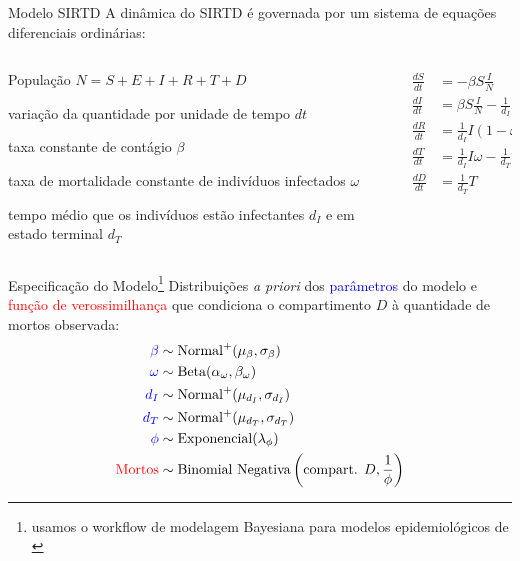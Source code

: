 \documentclass[aspectratio=169]{beamer}                    %
\begin{document}
\begin{frame}{Modelo SIRTD}
    A dinâmica do SIRTD é governada por um sistema de equações diferenciais ordinárias:
    \begin{columns}
        \begin{column}{0.5\textwidth}
            \begin{vfilleditems}
                \item População $N = S +E + I + R + T + D$
                \item variação da quantidade por unidade de tempo $dt$
                \item taxa constante de contágio $\beta$
                \item taxa de mortalidade constante de indivíduos infectados $\omega$
                \item tempo médio que os indivíduos estão infectantes $d_I$ e em estado terminal $d_T$
            \end{vfilleditems}
        \end{column}
        \begin{column}{0.5\textwidth}
            \begin{align*}
                \frac{dS}{dt} &= -\beta  S \frac{I}{N}\\
                \frac{dI}{dt} &= \beta  S  \frac{I}{N} - \frac{1}{d_I}  I \\
                \frac{dR}{dt} &= \frac{1}{d_I} I \left( 1 - \omega \right) \\
                \frac{dT}{dt} &= \frac{1}{d_I} I \omega - \frac{1}{d_T} T \\
                \frac{dD}{dt} &= \frac{1}{d_T} T \\
            \end{align*}
        \end{column}
    \end{columns}
\end{frame}

\begin{frame}{Especificação do Modelo\footnote{usamos o workflow de modelagem Bayesiana para modelos epidemiológicos de \textcite{grinsztajnBayesianWorkflowDisease2021}}}
    Distribuições \textit{a priori} dos \textcolor{blue}{parâmetros} do modelo e \textcolor{red}{função de verossimilhança} que condiciona o compartimento $D$ à quantidade de mortos observada:
    \begin{align*}
        \textcolor{blue}{\beta} &\sim \text{Normal}^+(\mu_\beta, \sigma_\beta) \\
        \textcolor{blue}{\omega} &\sim \text{Beta}(\alpha_\omega, \beta_\omega) \\
        \textcolor{blue}{d_I} &\sim \text{Normal}^+(\mu_{d_I}, \sigma_{d_I}) \\
        \textcolor{blue}{d_T} &\sim \text{Normal}^+(\mu_{d_T}, \sigma_{d_T}) \\
        \textcolor{blue}{\phi} &\sim \text{Exponencial}(\lambda_\phi) \\
        \textcolor{red}{\text{Mortos}} &\sim \text{Binomial Negativa}\left(\text{compart. $D$}, \frac{1}{\phi}\right)
    \end{align*}
\end{frame}
\end{document}
